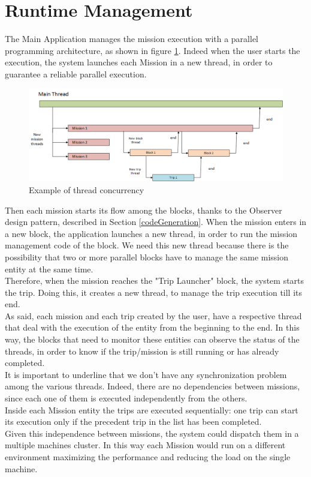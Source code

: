 \section{Runtime Management}\label{runtimeMng}

The Main Application manages the mission execution with a parallel programming architecture, as shown in figure \ref{fig:threads}.
Indeed when the user starts the execution, the system launches each Mission in a new thread, in order to guarantee a reliable parallel execution.
\\

\begin{figure}[h!]
\includegraphics[width=\linewidth]
{pictures/threads.png}
\caption{Example of thread concurrency}
\label{fig:threads}
\end{figure}

Then each mission starts its flow among the blocks, thanks to the Observer design pattern, described in Section \ref{codeGeneration}.
When the mission enters in a new block, the application launches a new thread, in order to run the mission management code of the block.
We need this new thread because there is the possibility that two or more parallel blocks have to manage the same mission entity at the same time.
\\

Therefore, when the mission reaches the "Trip Launcher" block, the system starts the trip.
Doing this, it creates a new thread, to manage the trip execution till its end.
\\

As said, each mission and each trip created by the user, have a respective thread that deal with the execution of the entity from the beginning to the end. In this way, the blocks that need to monitor these entities can observe the status of the threads, in order to know if the trip/mission is still running or has already completed.
\\

It is important to underline that we don't have any synchronization problem among the various threads.
Indeed, there are no dependencies between missions, since each one of them is executed independently from the others.
\\
Inside each Mission entity the trips are executed sequentially:
one trip can start its execution only if the precedent trip in the list has been completed.
\\
Given this independence between missions, the system could dispatch them in a multiple machines cluster. In this way each Mission would run on a different environment maximizing the performance and reducing the load on the single machine.
\\

